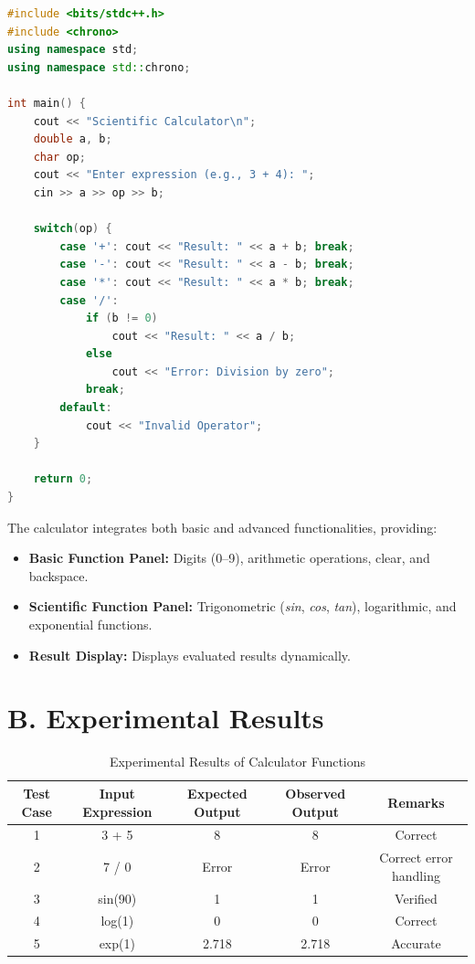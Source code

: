 \documentclass[a4paper,12pt,oneside]{report}
\numberwithin{equation}{chapter}
\numberwithin{figure}{chapter}
\numberwithin{table}{chapter}
\begin{document}
\begin{lstlisting}[language=C++, caption={Main Calculator Code}]
#include <bits/stdc++.h>
#include <chrono>
using namespace std;
using namespace std::chrono;

int main() {
    cout << "Scientific Calculator\n";
    double a, b;
    char op;
    cout << "Enter expression (e.g., 3 + 4): ";
    cin >> a >> op >> b;

    switch(op) {
        case '+': cout << "Result: " << a + b; break;
        case '-': cout << "Result: " << a - b; break;
        case '*': cout << "Result: " << a * b; break;
        case '/':
            if (b != 0)
                cout << "Result: " << a / b;
            else
                cout << "Error: Division by zero";
            break;
        default:
            cout << "Invalid Operator";
    }

    return 0;
}
\end{lstlisting}

The calculator integrates both basic and advanced functionalities, providing:

\begin{itemize}
    \item \textbf{Basic Function Panel:} Digits (0--9), arithmetic operations, clear, and backspace.
    \item \textbf{Scientific Function Panel:} Trigonometric (\textit{sin}, \textit{cos}, \textit{tan}), logarithmic, and exponential functions.
    \item \textbf{Result Display:} Displays evaluated results dynamically.
\end{itemize}

\section*{B. Experimental Results}

\begin{table}[H]
\centering
\begin{tabular}{|c|c|c|c|c|}
\hline
\textbf{Test Case} & \textbf{Input Expression} & \textbf{Expected Output} & \textbf{Observed Output} & \textbf{Remarks} \\ \hline
1 & 3 + 5 & 8 & 8 & Correct \\ \hline
2 & 7 / 0 & Error & Error & Correct error handling \\ \hline
3 & sin(90) & 1 & 1 & Verified \\ \hline
4 & log(1) & 0 & 0 & Correct \\ \hline
5 & exp(1) & 2.718 & 2.718 & Accurate \\ \hline
\end{tabular}
\caption{Experimental Results of Calculator Functions}
\end{table}
\end{document}
